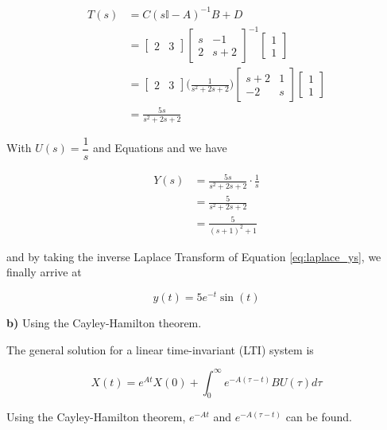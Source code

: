 \begin{align}
  T(s) &= C (s\mathbb{I} - A)^{-1} B + D \nonumber \\
       &=
       \begin{bmatrix}
        2 & 3
       \end{bmatrix}
       \begin{bmatrix}
        s & -1 \\
        2 & s + 2
      \end{bmatrix}^{-1}
      \begin{bmatrix}
       1 \\ 1
      \end{bmatrix} \nonumber \\
      &=
      \begin{bmatrix}
       2 & 3
      \end{bmatrix}
      \Bigg(\frac{1}{s^2 + 2s + 2} \Bigg)
      \begin{bmatrix}
       s + 2 & 1 \\
       -2     & s
      \end{bmatrix}
      \begin{bmatrix}
       1 \\ 1
      \end{bmatrix} \nonumber \\
      &= \frac{5s}{s^2 + 2s + 2} \label{eq:laplace_tf}
\end{align}

With $U(s) = \dfrac{1}{s}$ and Equations \label{eq:laplace_output_tf} and
\label{eq:laplace_tf} we have

\begin{align}
  Y(s) &= \frac{5s}{s^2 + 2s + 2} \cdot \frac{1}{s} \nonumber \\
       &= \frac{5}{s^2 + 2s + 2} \nonumber \\
       &= \frac{5}{(s + 1)^2 + 1} \label{eq:laplace_ys}
\end{align}

\noindent and by taking the inverse Laplace Transform of Equation
\ref{eq:laplace_ys}, we finally arrive at

\begin{equation}
  y(t) = 5e^{-t} \sin (t)
\end{equation}

\noindent \textbf{b)} Using the Cayley-Hamilton theorem.

The general solution for a linear time-invariant (LTI) system is

\begin{equation} \label{eq:lti_gen_sol}
  X(t) = e^{At}X(0) + \int_0^{\infty} e^{-A(\tau -t)} B U(\tau) d \tau
\end{equation}

\noindent Using the Cayley-Hamilton theorem, $e^{-At}$ and $e^{-A(\tau - t)}$
can be found.
